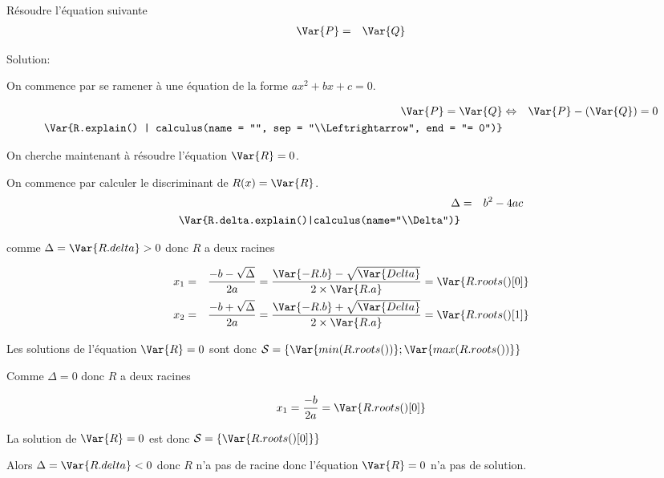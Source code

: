 \documentclass[a4paper,10pt]{article}
\begin{document}

    \bigskip
    ~\dotfill
    \bigskip
    
    
    Résoudre l'équation suivante
    \begin{eqnarray*}
        \Var{P} & = & \Var{Q}
    \end{eqnarray*}

    Solution:

    On commence par se ramener à une équation de la forme $ax^2+bx+c = 0$.


    \begin{eqnarray*}
        \Var{P} = \Var{Q} & \Leftrightarrow & \Var{P} - (\Var{Q}) = 0 \\
        \Var{R.explain() | calculus(name = "", sep = "\\Leftrightarrow", end = "= 0")}
    \end{eqnarray*}

    On cherche maintenant à résoudre l'équation $\Var{R} = 0$.
    
    On commence par calculer le discriminant de $R(x) = \Var{R}$.
    \begin{eqnarray*}
        \Delta & = & b^2-4ac \\
        \Var{R.delta.explain()|calculus(name="\\Delta")}
    \end{eqnarray*}

    comme $\Delta = \Var{R.delta} > 0$ donc $R$ a deux racines

    \begin{eqnarray*}
        x_1 & = & \frac{-b - \sqrt{\Delta}}{2a} =  \frac{\Var{-R.b} - \sqrt{\Var{Delta}}}{2 \times \Var{R.a}} = \Var{R.roots()[0] } \\
        x_2 & = & \frac{-b + \sqrt{\Delta}}{2a} =  \frac{\Var{-R.b} + \sqrt{\Var{Delta}}}{2 \times \Var{R.a}} = \Var{R.roots()[1] }
    \end{eqnarray*}

    Les solutions de l'équation $\Var{R} = 0$ sont donc $\mathcal{S} = \left\{ \Var{min(R.roots())}; \Var{max(R.roots())} \right\}$

    Comme $\Delta = 0$ donc $R$ a deux racines

    \begin{eqnarray*}
        x_1 = \frac{-b}{2a} = \Var{R.roots()[0]} \\
    \end{eqnarray*}

    La solution de $\Var{R} = 0$ est donc $\mathcal{S} = \left\{ \Var{R.roots()[0]}\right\}$

    Alors $\Delta = \Var{R.delta} < 0$ donc $R$ n'a pas de racine donc l'équation $\Var{R} = 0$ n'a pas de solution.

\end{document}
